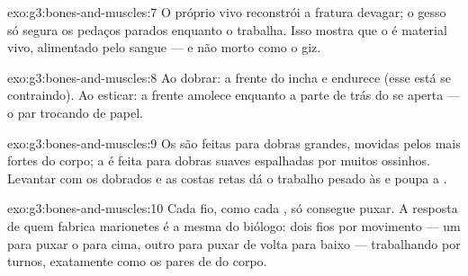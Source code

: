 \begin{solution}{exo:g3:bones-and-muscles:7}
O próprio  vivo reconstrói a fratura devagar; o gesso só segura
os pedaços parados enquanto o  trabalha. Isso mostra que o 
é material vivo, alimentado pelo sangue --- e não morto como o giz.
\end{solution}

\begin{solution}{exo:g3:bones-and-muscles:8}
Ao dobrar: a frente do  incha e endurece (esse  está se
contraindo). Ao esticar: a frente amolece enquanto a parte de trás
do  se aperta --- o par trocando de papel.
\end{solution}

\begin{solution}{exo:g3:bones-and-muscles:9}
Os  são  feitas para dobras grandes, movidas
pelos  mais fortes do corpo; a  é feita para dobras
suaves espalhadas por muitos ossinhos. Levantar com os 
dobrados e as costas retas dá o trabalho pesado às  e poupa a
.
\end{solution}

\begin{solution}{exo:g3:bones-and-muscles:10}
Cada fio, como cada , só consegue puxar. A resposta de quem
fabrica marionetes é a mesma do biólogo: dois fios por movimento ---
um para puxar o  para cima, outro para puxar de volta para
baixo --- trabalhando por turnos, exatamente como os pares de
 do corpo.
\end{solution}
